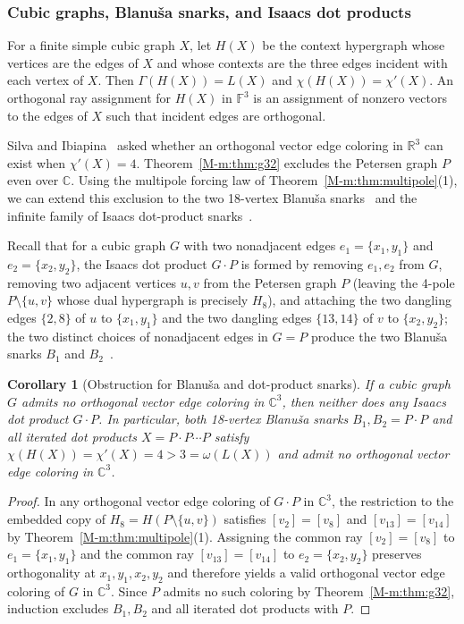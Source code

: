 \documentclass[aps,pra,reprint,superscriptaddress,longbibliography,nofootinbib,floatfix,10pt]{revtex4-2}
\newtheorem{corollary}[theorem]{Corollary}
\theoremstyle{definition}
\newcommand{\R}{\mathbb{R}}
\newcommand{\C}{\mathbb{C}}
\begin{document}
\subsubsection{Cubic graphs, Blanu\v{s}a snarks, and Isaacs dot products}

For a finite simple cubic graph $X$, let $H(X)$ be the context hypergraph whose
vertices are the edges of $X$ and whose contexts are the three edges incident
with each vertex of $X$. Then $\Gamma(H(X))=L(X)$ and $\chi(H(X))=\chi'(X)$.
An orthogonal ray assignment for $H(X)$ in $\mathbb F^3$ is an assignment of
nonzero vectors to the edges of $X$ such that incident edges are orthogonal.

Silva and Ibiapina~\cite[Question 6]{silva2019orthogonal} asked whether an
orthogonal vector edge coloring in $\R^3$ can exist when $\chi'(X)=4$.
Theorem~\ref{M-m:thm:g32} excludes the Petersen graph $P$ even over $\C$. Using the
multipole forcing law of Theorem~\ref{M-m:thm:multipole}(1), we can extend this
exclusion to the two 18-vertex Blanu\v{s}a snarks~\cite{blanusa1946problem} and
the infinite family of Isaacs dot-product snarks~\cite{isaacs1975infinite}.

Recall that for a cubic graph $G$ with two nonadjacent edges
$e_1=\{x_1,y_1\}$ and $e_2=\{x_2,y_2\}$, the Isaacs dot product $G\cdot P$ is
formed by removing $e_1,e_2$ from $G$, removing two adjacent vertices $u,v$
from the Petersen graph $P$ (leaving the 4-pole $P\setminus\{u,v\}$ whose dual
hypergraph is precisely $H_8$), and attaching the two dangling edges $\{2,8\}$
of $u$ to $\{x_1,y_1\}$ and the two dangling edges $\{13,14\}$ of $v$ to
$\{x_2,y_2\}$; the two distinct choices of nonadjacent edges in $G=P$ produce
the two Blanu\v{s}a snarks $B_1$ and $B_2$~\cite{blanusa1946problem,isaacs1975infinite,brinkmann2015snarks}.

\begin{corollary}[Obstruction for Blanu\v{s}a and dot-product snarks]\label{m:cor:snarks}
If a cubic graph $G$ admits no orthogonal vector edge coloring in $\C^3$, then
neither does any Isaacs dot product $G\cdot P$. In particular, both 18-vertex
Blanu\v{s}a snarks $B_1,B_2 = P\cdot P$ and all iterated dot products
$X = P\cdot P\cdots P$ satisfy $\chi(H(X))=\chi'(X)=4>3=\omega(L(X))$ and admit
no orthogonal vector edge coloring in $\C^3$.
\end{corollary}

\begin{proof}
In any orthogonal vector edge coloring of $G\cdot P$ in $\C^3$, the restriction
to the embedded copy of $H_8 = H(P\setminus\{u,v\})$ satisfies
$[v_2]=[v_8]$ and $[v_{13}]=[v_{14}]$ by Theorem~\ref{M-m:thm:multipole}(1).
Assigning the common ray $[v_2]=[v_8]$ to $e_1=\{x_1,y_1\}$ and the common ray
$[v_{13}]=[v_{14}]$ to $e_2=\{x_2,y_2\}$ preserves orthogonality at
$x_1,y_1,x_2,y_2$ and therefore yields a valid orthogonal vector edge coloring
of $G$ in $\C^3$. Since $P$ admits no such coloring by Theorem~\ref{M-m:thm:g32},
induction excludes $B_1,B_2$ and all iterated dot products with $P$.
\end{proof}
\end{document}
